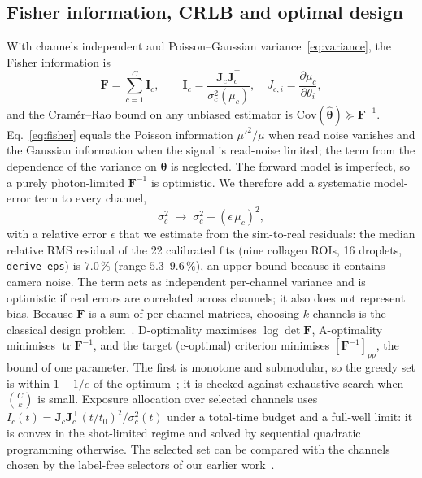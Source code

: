 \documentclass[journal]{IEEEtran}
\DeclareMathOperator{\tr}{tr}
\begin{document}
\subsection{Fisher information, CRLB and optimal design}
With channels independent and Poisson--Gaussian variance~\eqref{eq:variance}, the Fisher information is
\begin{equation}
\mathbf F=\sum_{c=1}^C \mathbf I_c,\qquad \mathbf I_c=\frac{\mathbf J_c\mathbf J_c^{\top}}{\sigma_c^2(\mu_c)},\quad J_{c,i}=\frac{\partial\mu_c}{\partial\theta_i},
\label{eq:fisher}
\end{equation}
and the Cram\'er--Rao bound on any unbiased estimator is $\mathrm{Cov}(\hat{\boldsymbol\theta})\succeq\mathbf F^{-1}$. Eq.~\eqref{eq:fisher} equals the Poisson information $\mu'^2/\mu$ when read noise vanishes and the Gaussian information when the signal is read-noise limited; the term from the dependence of the variance on $\boldsymbol\theta$ is neglected. The forward model is imperfect, so a purely photon-limited $\mathbf F^{-1}$ is optimistic. We therefore add a systematic model-error term to every channel,
\begin{equation}
\sigma_c^2\;\to\;\sigma_c^2+(\epsilon\,\mu_c)^2,
\label{eq:modelerr}
\end{equation}
with a relative error $\epsilon$ that we estimate from the sim-to-real residuals: the median relative RMS residual of the 22 calibrated fits (nine collagen ROIs, 16 droplets, \texttt{derive\_eps}) is $7.0\,\%$ (range $5.3$--$9.6\,\%$), an upper bound because it contains camera noise. The term acts as independent per-channel variance and is optimistic if real errors are correlated across channels; it also does not represent bias. Because $\mathbf F$ is a sum of per-channel matrices, choosing $k$ channels is the classical design problem~\cite{pukelsheim2006}. D-optimality maximises $\log\det\mathbf F$, A-optimality minimises $\tr\mathbf F^{-1}$, and the target (c-optimal) criterion minimises $[\mathbf F^{-1}]_{pp}$, the bound of one parameter. The first is monotone and submodular, so the greedy set is within $1-1/e$ of the optimum~\cite{nemhauser1978}; it is checked against exhaustive search when $\binom Ck$ is small. Exposure allocation over selected channels uses $I_c(t)=\mathbf J_c\mathbf J_c^\top(t/t_0)^2/\sigma_c^2(t)$ under a total-time budget and a full-well limit: it is convex in the shot-limited regime and solved by sequential quadratic programming otherwise. The selected set can be compared with the channels chosen by the label-free selectors of our earlier work~\cite{meloyan2025scirep}.
\end{document}
